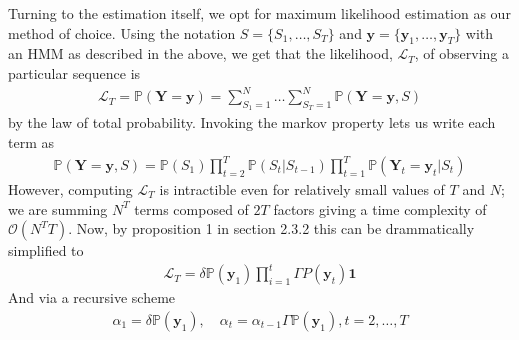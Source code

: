 Turning to the estimation itself, we opt for  
 maximum likelihood estimation as our method of choice. Using the notation $S = \{S_1,\dots, S_T\}$ and $\mathbf{y} = \{\mathbf{y}_1,\dots, \mathbf{y}_T\}$ with an HMM as described in the above, we get that the likelihood, $\mathcal{L}_T$, of observing a particular sequence is
\begin{align}
    \mathcal{L}_T = \mathbb{P}(\mathbf{Y} = \mathbf{y}) = \sum_{S_1 = 1}^N\dots \sum_{S_T = 1}^N \mathbb{P}(\mathbf{Y} = \mathbf{y}, S)
\end{align}
by the law of total probability.
Invoking the markov property lets us write each term as
\begin{align}
    \mathbb{P}(\mathbf{Y} = \mathbf{y}, S) = \mathbb{P}(S_1)\prod_{t = 2}^T \mathbb{P}(S_t | S_{t-1})\prod_{t = 1}^T \mathbb{P}(\mathbf{Y}_t = \mathbf{y}_t | S_t) 
    \label{termsInLikelihood}
\end{align}
However, computing $\mathcal{L}_T$ is intractible even for relatively small values of $T$ and $N$; we are summing $N^T$ terms composed of $2T$ factors giving a time complexity of $\mathcal{O}\left(N^TT\right)$. Now, by proposition 1 in section 2.3.2 \cite{HHMForTimesSeries} this can be drammatically simplified to
\begin{align}
    \mathcal{L}_T = \delta\mathbb{P}(\mathbf{y}_1)\prod_{i = 1}^{t}\Gamma P(\mathbf{y}_t)\mathbf{1}
    \label{likelihoodOpt}
\end{align}
And via a recursive scheme
\begin{align}
    \alpha_1 = \delta\mathbb{P}(\mathbf{y}_1), \quad \alpha_t = \alpha_{t-1}\Gamma\mathbb{P}(\mathbf{y}_1), t = 2,\dots, T
\end{align}
